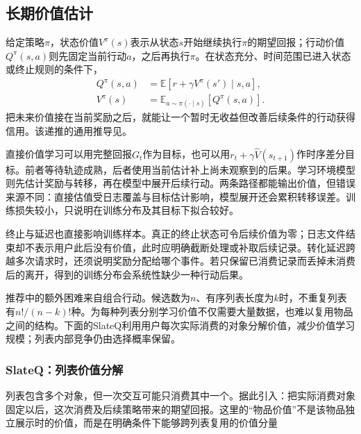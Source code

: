\subsection{长期价值估计}
\label{sec:rs-long-term-estimation}

给定策略$\pi$，状态价值$V^\pi(s)$表示从状态$s$开始继续执行$\pi$的期望回报；行动价值$Q^\pi(s,a)$则先固定当前行动$a$，之后再执行$\pi$。在状态充分、时间范围已进入状态或终止规则的条件下，
\begin{equation}
 \begin{aligned}
 Q^\pi(s,a)
   &=\mathbb{E}[r+\gamma V^\pi(s')\mid s,a],\\
 V^\pi(s)
   &=\mathbb{E}_{a\sim\pi(\cdot\mid s)}[Q^\pi(s,a)].
 \end{aligned}
 \label{eq:rs-policy-value}
\end{equation}
把未来价值接在当前奖励之后，就能让一个暂时无收益但改善后续条件的行动获得信用。该递推的通用推导见。

直接价值学习可以用完整回报$G_t$作为目标，也可以用$r_t+\gamma\widehat V(s_{t+1})$作时序差分目标。前者等待轨迹成熟，后者使用当前估计补上尚未观察到的后果。学习环境模型则先估计奖励与转移，再在模型中展开后续行动。两条路径都能输出价值，但错误来源不同：直接估值受日志覆盖与目标估计影响，模型展开还会累积转移误差。训练损失较小，只说明在训练分布及其目标下拟合较好。

终止与延迟也直接影响训练样本。真正的终止状态可令后续价值为零；日志文件结束却不表示用户此后没有价值，此时应明确截断处理或补取后续记录。转化延迟跨越多次请求时，还须说明奖励分配给哪个事件。若只保留已消费记录而丢掉未消费后的离开，得到的训练分布会系统性缺少一种行动后果。

推荐中的额外困难来自组合行动。候选数为$n$、有序列表长度为$k$时，不重复列表有$n!/(n-k)!$种。为每种列表分别学习价值不仅需要大量数据，也难以复用物品之间的结构。下面的SlateQ利用用户每次实际消费的对象分解价值，减少价值学习规模；列表内部竞争仍由选择概率保留。

\Needspace{110mm}
\subsubsection{SlateQ：列表价值分解}
\label{sec:rs-slateq}

列表包含多个对象，但一次交互可能只消费其中一个。据此引入：把实际消费对象固定以后，这次消费及后续策略带来的期望回报。这里的“物品价值”不是该物品独立展示时的价值，而是在明确条件下能够跨列表复用的价值分量

